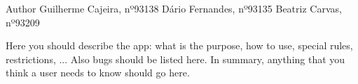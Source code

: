 \begin{DoxyAuthor}{Author}
Guilherme Cajeira, nº93138 Dário Fernandes, nº93135 Beatriz Carvas, nº93209
\end{DoxyAuthor}
Here you should describe the app\+: what is the purpose, how to use, special rules, restrictions, ... Also bugs should be listed here. In summary, anything that you think a user needs to know should go here. 